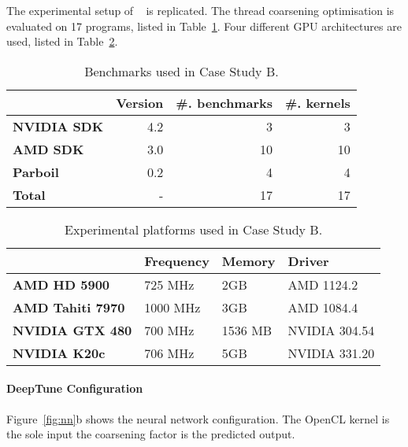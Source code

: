 The experimental setup of \citeauthor{Magni2014}~\cite{Magni2014} is replicated. The thread coarsening optimisation is evaluated on 17 programs, listed in Table~\ref{tab:pact-benchmarks}. Four different GPU architectures are used, listed in Table~\ref{tab:pact-platforms}.

\begin{table}
  \centering%
  \begin{tabular}{| l r r r |}
    \hline
    \rowcolor{gray!50}
    & \textbf{Version} & \textbf{\#. benchmarks} & \textbf{\#. kernels}\\
    \hline
    \textbf{NVIDIA SDK} & 4.2 & 3 & 3 \\
    \textbf{AMD SDK} & 3.0 & 10 & 10 \\
    \textbf{Parboil~\cite{Stratton2012}} & 0.2 & 4 & 4 \\
    \textbf{Total} & - & 17 & 17 \\
    \hline
  \end{tabular}
  \label{tab:pact-benchmarks}
  \caption[Benchmarks used in Case Study B]{%
    Benchmarks used in Case Study B.%
  }
\end{table}

\begin{table}[t!]
  \centering %
    \begin{tabular}{| l l l l |}
      \hline
      \rowcolor{gray!50}
      & \textbf{Frequency} & \textbf{Memory} & \textbf{Driver} \\
      \hline
      \textbf{AMD HD 5900} & 725 MHz & 2GB & AMD 1124.2 \\
      \textbf{AMD Tahiti 7970} & 1000 MHz & 3GB & AMD 1084.4 \\
      \textbf{NVIDIA GTX 480} & 700 MHz & 1536 MB & NVIDIA 304.54 \\
      \textbf{NVIDIA K20c} & 706 MHz & 5GB & NVIDIA 331.20 \\
      \hline
    \end{tabular}
    \caption[Experimental platforms used in Case Study B]{%
    Experimental platforms used in Case Study B.%
  }
    \label{tab:pact-platforms}
\end{table}


\paragraph*{DeepTune Configuration}

Figure~\ref{fig:nn}b shows the neural network configuration. The OpenCL kernel is the sole input the coarsening factor is the predicted output.

